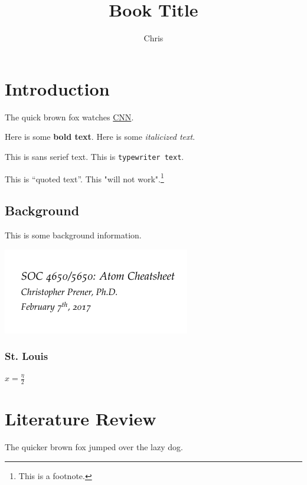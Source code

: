 \documentclass{book}
\title{Book Title}
\author{Chris}
\date{}
\begin{document}
\maketitle

\tableofcontents

\chapter{Introduction}
The quick brown fox watches \href{www.cnn.com}{CNN}. 

\vspace{3mm}
\noindent Here is some \textbf{bold text}. Here is some \textit{italicized text}.

This is \textsf{sans serief text}. This is \texttt{typewriter text}.

This is ``quoted text''. This "will not work".\footnote{This is a footnote.}

\section*{Background}
This is some background information.

\newpage

\includegraphics[scale=.75]{testImage.png}
\label{fig:fig1}

\newpage
\subsection*{St. Louis}

$ x = \frac{\eta}{2} $

\chapter{Literature Review}
The quicker brown fox jumped over the lazy dog.
\end{document}
